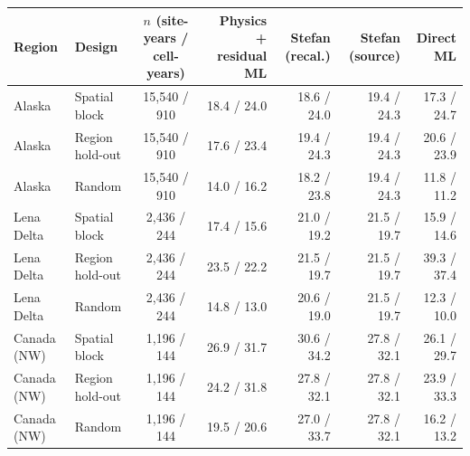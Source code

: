 \setlength{\tabcolsep}{3.5pt}\begin{tabular}{@{}llcrrrr@{}}
\toprule
Region & Design & $n$ (site-years / cell-years) & Physics + residual ML & Stefan (recal.) & Stefan (source) & Direct ML \\
\midrule
Alaska & Spatial block & 15,540 / 910 & 18.4 / 24.0 & 18.6 / 24.0 & 19.4 / 24.3 & 17.3 / 24.7 \\
Alaska & Region hold-out & 15,540 / 910 & 17.6 / 23.4 & 19.4 / 24.3 & 19.4 / 24.3 & 20.6 / 23.9 \\
Alaska & Random & 15,540 / 910 & 14.0 / 16.2 & 18.2 / 23.8 & 19.4 / 24.3 & 11.8 / 11.2 \\
Lena Delta & Spatial block & 2,436 / 244 & 17.4 / 15.6 & 21.0 / 19.2 & 21.5 / 19.7 & 15.9 / 14.6 \\
Lena Delta & Region hold-out & 2,436 / 244 & 23.5 / 22.2 & 21.5 / 19.7 & 21.5 / 19.7 & 39.3 / 37.4 \\
Lena Delta & Random & 2,436 / 244 & 14.8 / 13.0 & 20.6 / 19.0 & 21.5 / 19.7 & 12.3 / 10.0 \\
Canada (NW) & Spatial block & 1,196 / 144 & 26.9 / 31.7 & 30.6 / 34.2 & 27.8 / 32.1 & 26.1 / 29.7 \\
Canada (NW) & Region hold-out & 1,196 / 144 & 24.2 / 31.8 & 27.8 / 32.1 & 27.8 / 32.1 & 23.9 / 33.3 \\
Canada (NW) & Random & 1,196 / 144 & 19.5 / 20.6 & 27.0 / 33.7 & 27.8 / 32.1 & 16.2 / 13.2 \\
\bottomrule
\end{tabular}

